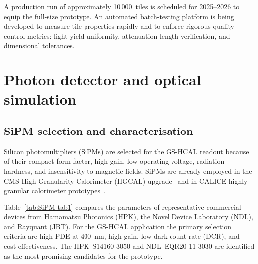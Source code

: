 \documentclass[preprint,12pt,times]{elsarticle}
\begin{document}
A production run of approximately 10\,000~tiles is scheduled for
2025--2026 to equip the full-size prototype.
An automated batch-testing platform is being developed to measure tile
properties rapidly and to enforce rigorous quality-control metrics:
light-yield uniformity, attenuation-length verification, and
dimensional tolerances.

\section{Photon detector and optical simulation}
\label{sec:photondet}

\subsection{SiPM selection and characterisation}
\label{subsec:sipm}

Silicon photomultipliers (SiPMs) are selected for the GS-HCAL readout
because of their compact form factor, high gain, low operating voltage,
radiation hardness, and insensitivity to magnetic fields.
SiPMs are already employed in the CMS High-Granularity Calorimeter
(HGCAL) upgrade~\cite{CMS:2017jpq} and in CALICE highly-granular
calorimeter prototypes~\cite{calice}.

Table~\ref{tab:SiPM-tab1} compares the parameters of representative
commercial devices from Hamamatsu Photonics (HPK), the Novel Device
Laboratory (NDL), and Rayquant (JBT).
For the GS-HCAL application the primary selection criteria are high PDE
at \SI{400}{nm}, high gain, low dark count rate (DCR), and
cost-effectiveness.
The HPK~S14160-3050 and NDL~EQR20-11-3030 are identified as the most
promising candidates for the prototype.
\end{document}
